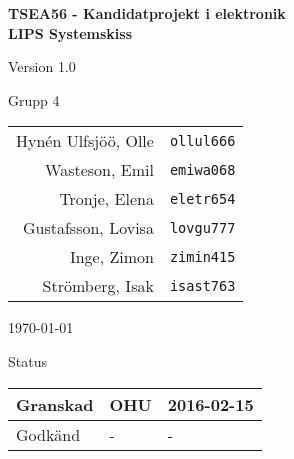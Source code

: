 \documentclass[11pt]{article}
\begin{document}
\begin{titlepage}
\begin{center}

{\Large\bfseries TSEA56 - Kandidatprojekt i elektronik \\ LIPS Systemskiss}

\vspace{5em}

Version 1.0

\vspace{5em}
Grupp 4 \\
\begin{tabular}{rl}
Hynén Ulfsjöö, Olle&\verb+ollul666+
\\
Wasteson, Emil&\verb+emiwa068+
\\
Tronje, Elena&\verb+eletr654+
\\
Gustafsson, Lovisa&\verb+lovgu777+
\\
Inge, Zimon&\verb+zimin415+
\\
Strömberg, Isak&\verb+isast763+
\\
\end{tabular}

\vspace{5em}
\today

\vspace{16em}
Status
\begin{longtable}{|l|l|l|} \hline

Granskad & OHU & 2016-02-15 \\ \hline
Godkänd & - & - \\ \hline
 
\end{longtable}

\end{center}
\end{titlepage}
\end{document}
